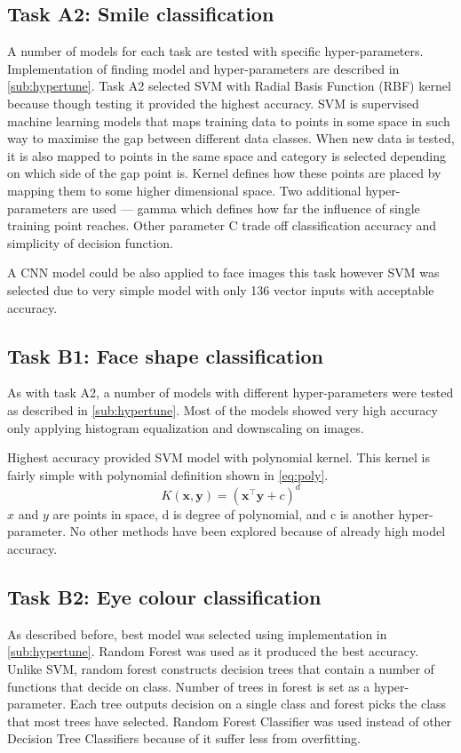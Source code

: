 \documentclass{article}
\begin{document}
\subsection{Task A2: Smile classification}
\label{sub:svm}
A number of models for each task are tested with specific hyper-parameters. Implementation of finding model and hyper-parameters are described in \autoref{sub:hypertune}. Task A2 selected SVM with Radial Basis Function (RBF) kernel because though testing it provided the highest accuracy. SVM is supervised machine learning models that maps training data to points in some space in such way to maximise the gap between different data classes. When new data is tested, it is also mapped to points in the same space and category is selected depending on which side of the gap point is. Kernel defines how these points are placed by mapping them to some higher dimensional space. Two additional hyper-parameters are used — gamma which defines how far the influence of single training point reaches. Other parameter C trade off classification accuracy and simplicity of decision function. 

A CNN model could be also applied to face images this task however SVM was selected due to very simple model with only 136 vector inputs with acceptable accuracy.
\subsection{Task B1: Face shape classification}
As with task A2, a number of models with different hyper-parameters were tested as described in \autoref{sub:hypertune}. Most of the models showed very high accuracy only applying histogram equalization and downscaling on images. 

Highest accuracy provided SVM model with polynomial kernel. This kernel is fairly simple with polynomial definition shown in \autoref{eq:poly}.
\begin{equation}\label{eq:poly}
	K(\pmb{x},\pmb{y}) = (\pmb{x}^\top\pmb{y}+c)^d
\end{equation}
$x$ and $y$ are points in space, d is degree of polynomial, and c is another hyper-parameter.
No other methods have been explored because of already high model accuracy. 

\subsection{Task B2: Eye colour classification}
As described before, best model was selected using implementation in \autoref{sub:hypertune}. 
Random Forest was used as it produced the best accuracy. Unlike SVM, random forest constructs decision trees that contain a number of functions that decide on class. Number of trees in forest is set as a hyper-parameter. Each tree outputs decision on a single class and forest picks the class that most trees have selected. Random Forest Classifier was used instead of other Decision Tree Classifiers because of it suffer less from overfitting.
\end{document}
